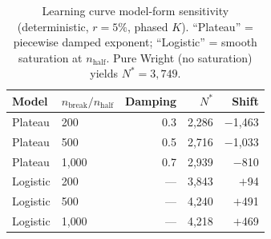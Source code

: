 \begin{table}[htbp]
\centering
\caption{Learning curve model-form sensitivity (deterministic, $r = 5\%$, phased $K$). ``Plateau'' = piecewise damped exponent; ``Logistic'' = smooth saturation at $n_{\mathrm{half}}$. Pure Wright (no saturation) yields $N^* = 3{,}749$.}
\label{tab:logistic_comparison}
\small
\begin{tabular}{@{}llrrr@{}}
\toprule
Model & $n_{\mathrm{break}}/n_{\mathrm{half}}$ & Damping & $N^*$ & Shift \\
\midrule
Plateau  & 200   & 0.3 & 2{,}286 & $-$1{,}463 \\
Plateau  & 500   & 0.5 & 2{,}716 & $-$1{,}033 \\
Plateau  & 1{,}000 & 0.7 & 2{,}939 & $-$810 \\
Logistic & 200   & --- & 3{,}843 & $+$94 \\
Logistic & 500   & --- & 4{,}240 & $+$491 \\
Logistic & 1{,}000 & --- & 4{,}218 & $+$469 \\
\bottomrule
\end{tabular}
\end{table}
